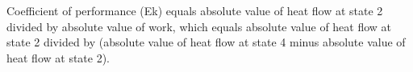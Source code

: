 Coefficient of performance (Ek) equals absolute value of heat flow at state 2 divided by absolute value of work, which equals absolute value of heat flow at state 2 divided by (absolute value of heat flow at state 4 minus absolute value of heat flow at state 2).